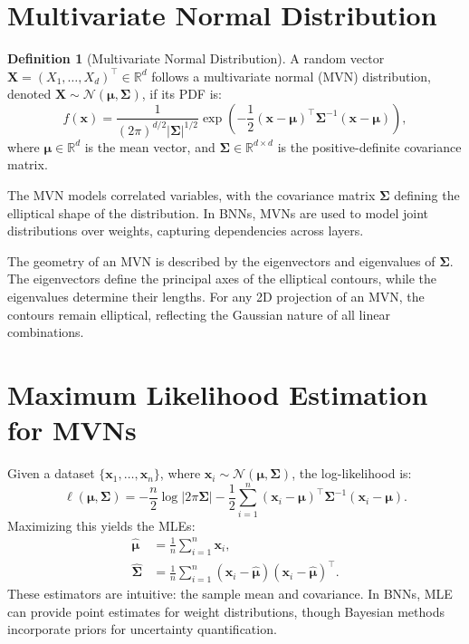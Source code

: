 \documentclass[12pt]{article}
\theoremstyle{plain}
\theoremstyle{definition}
\newtheorem{definition}{Definition}
\newcommand{\N}{\mathcal{N}}
\begin{document}
\section{Multivariate Normal Distribution}
\begin{definition}[Multivariate Normal Distribution]
A random vector \( \mathbf{X} = (X_1, \ldots, X_d)^\top \in \mathbb{R}^d \) follows a multivariate normal (MVN) distribution, denoted \( \mathbf{X} \sim \N(\boldsymbol{\mu}, \boldsymbol{\Sigma}) \), if its PDF is:
\begin{equation}
f(\mathbf{x}) = \frac{1}{(2\pi)^{d/2} |\boldsymbol{\Sigma}|^{1/2}} \exp\left(-\frac{1}{2} (\mathbf{x} - \boldsymbol{\mu})^\top \boldsymbol{\Sigma}^{-1} (\mathbf{x} - \boldsymbol{\mu})\right),
\end{equation}
where \( \boldsymbol{\mu} \in \mathbb{R}^d \) is the mean vector, and \( \boldsymbol{\Sigma} \in \mathbb{R}^{d \times d} \) is the positive-definite covariance matrix.
\end{definition}
The MVN models correlated variables, with the covariance matrix \( \boldsymbol{\Sigma} \) defining the elliptical shape of the distribution. In BNNs, MVNs are used to model joint distributions over weights, capturing dependencies across layers.

The geometry of an MVN is described by the eigenvectors and eigenvalues of \( \boldsymbol{\Sigma} \). The eigenvectors define the principal axes of the elliptical contours, while the eigenvalues determine their lengths. For any 2D projection of an MVN, the contours remain elliptical, reflecting the Gaussian nature of all linear combinations.

\section{Maximum Likelihood Estimation for MVNs}
Given a dataset \( \{\mathbf{x}_1, \ldots, \mathbf{x}_n\} \), where \( \mathbf{x}_i \sim \N(\boldsymbol{\mu}, \boldsymbol{\Sigma}) \), the log-likelihood is:
\begin{equation}
\ell(\boldsymbol{\mu}, \boldsymbol{\Sigma}) = -\frac{n}{2} \log |2\pi \boldsymbol{\Sigma}| - \frac{1}{2} \sum_{i=1}^n (\mathbf{x}_i - \boldsymbol{\mu})^\top \boldsymbol{\Sigma}^{-1} (\mathbf{x}_i - \boldsymbol{\mu}).
\end{equation}
Maximizing this yields the MLEs:
\begin{align}
\hat{\boldsymbol{\mu}} &= \frac{1}{n} \sum_{i=1}^n \mathbf{x}_i, \\
\hat{\boldsymbol{\Sigma}} &= \frac{1}{n} \sum_{i=1}^n (\mathbf{x}_i - \hat{\boldsymbol{\mu}}) (\mathbf{x}_i - \hat{\boldsymbol{\mu}})^\top.
\end{align}
These estimators are intuitive: the sample mean and covariance. In BNNs, MLE can provide point estimates for weight distributions, though Bayesian methods incorporate priors for uncertainty quantification.
\end{document}
